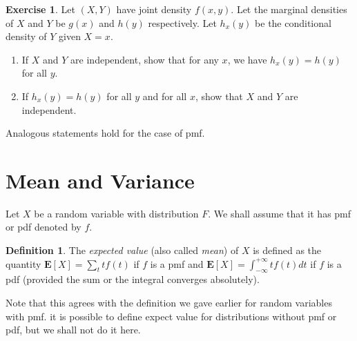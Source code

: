 \documentclass[preprint,  11pt]{amsart}
\theoremstyle{plain} %
\theoremstyle{definition} %
\newtheorem{definition}[theorem]{Definition}
\newtheorem{exercise}[theorem]{Exercise}
\begin{document}
{\begin{exercise} Let $(X,Y)$ have joint density $f(x,y)$. Let the marginal densities of $X$ and $Y$ be $g(x)$ and $h(y)$ respectively. Let $h_{x}(y)$ be the conditional density of $Y$ given $X=x$. 
\begin{enumerate}\setlength\itemsep{6pt}
\item If $X$ and $Y$ are independent, show that for any $x$, we have $h_{x}(y)=h(y)$ for all $y$.
\item If $h_{x}(y)=h(y)$ for all $y$ and for all $x$, show that $X$ and $Y$ are independent.
\end{enumerate}
Analogous statements hold for the case of pmf.
\end{exercise}
}

\section{Mean and Variance}
Let $X$ be a random variable with distribution $F$. We shall assume that it has pmf or pdf denoted by $f$. 
\begin{definition} The {\em expected value} (also called {\em mean}) of $X$ is defined as the quantity $\mathbf{E}[X]=\sum_{t}tf(t)$ if $f$ is a pmf and $\mathbf{E}[X]=\int_{-\infty}^{+\infty} t f(t)dt$ if $f$ is a pdf (provided the sum or the integral converges absolutely). \end{definition}
Note that this agrees with the definition we gave earlier for random variables with pmf. it is possible to define expect value for distributions without pmf or pdf, but we shall not do it here.
\end{document}
